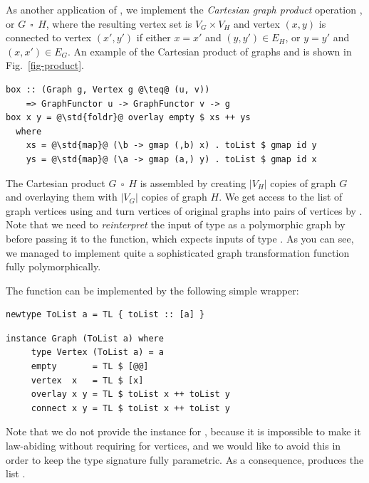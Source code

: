 As another application of , we implement the \emph{Cartesian graph
product} operation , or $G~~\square~~H$, where the resulting vertex set is
$V_G \times V_H$ and vertex $(x, y)$ is connected to vertex $(x', y')$ if
either $x = x'$ and $(y, y') \in E_H$, or $y = y'$ and $(x,x')\in E_G$. An example of the Cartesian product of graphs 
and  is shown in Fig.~\ref{fig-product}.

\begin{verbatim}
box :: (Graph g, Vertex g @\teq@ (u, v))
    => GraphFunctor u -> GraphFunctor v -> g
box x y = @\std{foldr}@ overlay empty $ xs ++ ys
  where
    xs = @\std{map}@ (\b -> gmap (,b) x) . toList $ gmap id y
    ys = @\std{map}@ (\a -> gmap (a,) y) . toList $ gmap id x
\end{verbatim}

The Cartesian product $G~~\square~~H$ is assembled by creating $|V_H|$ copies
of graph $G$ and overlaying them with $|V_G|$ copies of graph $H$. We get
access to the list of graph vertices using  and turn vertices of
original graphs into pairs of vertices by . Note that we need to
\emph{reinterpret} the input of type  as a polymorphic graph
by  before passing it to the  function, which expects
inputs of type . As you can see, we managed to implement quite
a sophisticated graph transformation function  fully polymorphically.

The  function can be implemented by the following simple 
wrapper:

\begin{verbatim}
newtype ToList a = TL { toList :: [a] }
\end{verbatim}
\vspace{1mm}
\begin{verbatim}
instance Graph (ToList a) where
     type Vertex (ToList a) = a
     empty       = TL $ [@@]
     vertex  x   = TL $ [x]
     overlay x y = TL $ toList x ++ toList y
     connect x y = TL $ toList x ++ toList y
\end{verbatim}

\noindent
Note that we do not provide the  instance for , because it
is impossible to make it law-abiding without requiring  for vertices,
and we would like to avoid this in order to keep the  type signature
fully parametric. As a consequence,  produces the
list \hs{[1,1]}.


